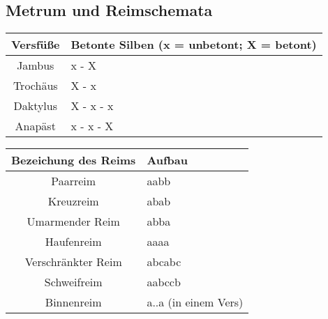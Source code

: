 

\subsection{Metrum und Reimschemata}
\label{sec:metrum}

\setlength{\tabcolsep}{4pt}

\renewcommand{\arraystretch}{1.3}
\begin{tabularx}{\textwidth}{|c|X|}
    \hline
    Versfüße & Betonte Silben (x = unbetont; X = betont) \\
    \hline
    \hline
    Jambus & x - X \\
    \hline
    Trochäus & X - x \\
    \hline
    Daktylus & X - x - x \\
    \hline
    Anapäst & x - x - X \\
    \hline
\end{tabularx}



\setlength{\tabcolsep}{4pt}

\renewcommand{\arraystretch}{1.3}
\begin{tabularx}{\textwidth}{|c|X|}
    \hline
    Bezeichung des Reims & Aufbau \\
    \hline
    \hline
    Paarreim & aabb \\
    \hline
    Kreuzreim & abab \\
    \hline 
    Umarmender Reim & abba \\
    \hline
    Haufenreim & aaaa \\
    \hline
    Verschränkter Reim & abcabc \\
    \hline
    Schweifreim & aabccb \\
    \hline
    Binnenreim & a..a (in einem Vers) \\
    \hline
\end{tabularx}
